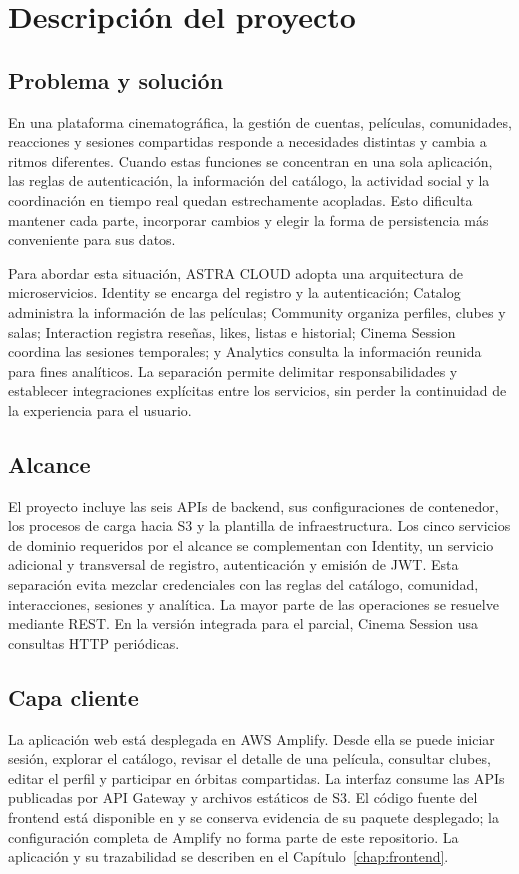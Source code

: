 ﻿\chapter{Descripción del proyecto}
\section{Problema y solución}
En una plataforma cinematográfica, la gestión de cuentas, películas, comunidades, reacciones y sesiones compartidas responde a necesidades distintas y cambia a ritmos diferentes. Cuando estas funciones se concentran en una sola aplicación, las reglas de autenticación, la información del catálogo, la actividad social y la coordinación en tiempo real quedan estrechamente acopladas. Esto dificulta mantener cada parte, incorporar cambios y elegir la forma de persistencia más conveniente para sus datos.

Para abordar esta situación, ASTRA CLOUD adopta una arquitectura de microservicios. Identity se encarga del registro y la autenticación; Catalog administra la información de las películas; Community organiza perfiles, clubes y salas; Interaction registra reseñas, likes, listas e historial; Cinema Session coordina las sesiones temporales; y Analytics consulta la información reunida para fines analíticos. La separación permite delimitar responsabilidades y establecer integraciones explícitas entre los servicios, sin perder la continuidad de la experiencia para el usuario.
\section{Alcance}
El proyecto incluye las seis APIs de backend, sus configuraciones de contenedor, los procesos de carga hacia S3 y la plantilla de infraestructura. Los cinco servicios de dominio requeridos por el alcance se complementan con Identity, un servicio adicional y transversal de registro, autenticación y emisión de JWT. Esta separación evita mezclar credenciales con las reglas del catálogo, comunidad, interacciones, sesiones y analítica. La mayor parte de las operaciones se resuelve mediante REST. En la versión integrada para el parcial, Cinema Session usa consultas HTTP periódicas.
\section{Capa cliente}
La aplicación web está desplegada en AWS Amplify. Desde ella se puede iniciar sesión, explorar el catálogo, revisar el detalle de una película, consultar clubes, editar el perfil y participar en órbitas compartidas. La interfaz consume las APIs publicadas por API Gateway y archivos estáticos de S3. El código fuente del frontend está disponible en  y se conserva evidencia de su paquete desplegado; la configuración completa de Amplify no forma parte de este repositorio. La aplicación y su trazabilidad se describen en el Capítulo~\ref{chap:frontend}.
